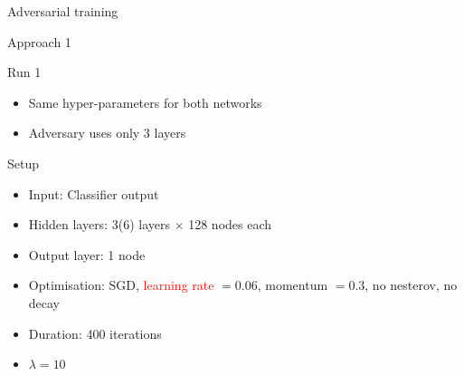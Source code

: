 


\begin{frame}[c]
\begin{center}
\Huge Adversarial training
\end{center}
\end{frame}

\begin{frame}{Approach 1}
    \begin{block}{Run 1}
\begin{itemize}
    \item Same hyper-parameters for both networks
    \item Adversary uses only 3 layers
\end{itemize}
    \end{block}
    \begin{block}{Setup}
    \begin{itemize}
    \item Input: Classifier output
    \item Hidden layers: \num{3}(\num{6}) \ELU layers $\times$ \num{128} nodes each
    \item Output layer: \num{1} \SIGMOID node
    \item Optimisation: SGD, \textcolor{red}{learning rate} $=0.06$, momentum $=0.3$, no nesterov, no decay
    \item Duration: 400 iterations
    \item $\lambda = 10$
    \end{itemize}
    \end{block}
\end{frame}

